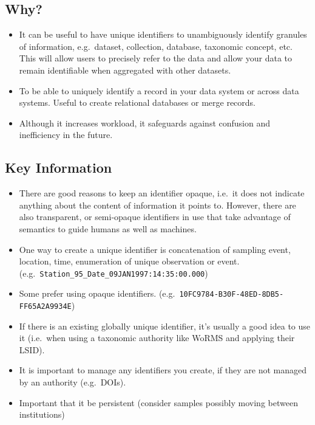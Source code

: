 \documentclass[
  oneside]{book}
\providecommand{\tightlist}{%
  \setlength{\itemsep}{0pt}\setlength{\parskip}{0pt}}
\begin{document}
\hypertarget{why-5}{%
\subsection{Why?}\label{why-5}}

\begin{itemize}
\tightlist
\item
  It can be useful to have unique identifiers to unambiguously identify granules of information, e.g.~dataset, collection, database, taxonomic concept, etc. This will allow users to precisely refer to the data and allow your data to remain identifiable when aggregated with other datasets.
\item
  To be able to uniquely identify a record in your data system or across data systems.
  Useful to create relational databases or merge records.
\item
  Although it increases workload, it safeguards against confusion and inefficiency in the future.
\end{itemize}

\hypertarget{key-information-5}{%
\subsection{Key Information}\label{key-information-5}}

\begin{itemize}
\tightlist
\item
  There are good reasons to keep an identifier opaque, i.e.~it does not indicate anything about the content of information it points to. However, there are also transparent, or semi-opaque identifiers in use that take advantage of semantics to guide humans as well as machines.
\item
  One way to create a unique identifier is concatenation of sampling event, location, time, enumeration of unique observation or event. (e.g.~\texttt{Station\_95\_Date\_09JAN1997:14:35:00.000})
\item
  Some prefer using opaque identifiers.
  (e.g.~\texttt{10FC9784-B30F-48ED-8DB5-FF65A2A9934E})
\item
  If there is an existing globally unique identifier, it's usually a good idea to use it (i.e.~when using a taxonomic authority like WoRMS and applying their LSID).
\item
  It is important to manage any identifiers you create, if they are not managed by an authority (e.g.~DOIs).
\item
  Important that it be persistent (consider samples possibly moving between institutions)
\end{itemize}
\end{document}
